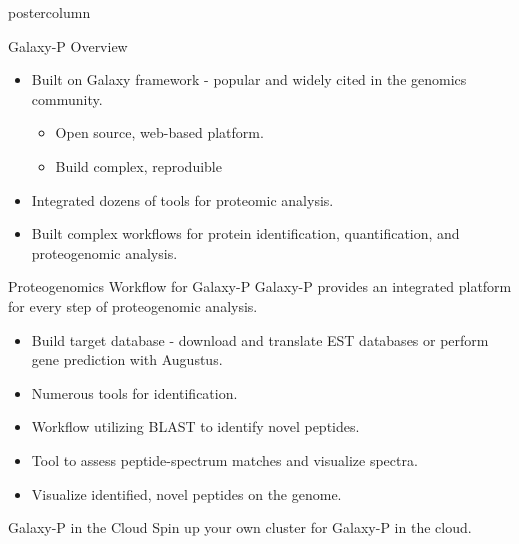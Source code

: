 \documentclass[final]{beamer}
\title[Innovative, Reproducible MS-Based Proteomic Informatics in the Cloud for Emerging Applications with Galaxy-P and CloudBioLinux]{}
\author[John M. Chilton; James E. Johnson; Ebbing P. de Jong; Getiria Onsongo; Benjamin J.
Lynch; Pratik D. Jagtap; Timothy J Griffin]{}
\institute[University of Minnesota]{Supcomputing Institute}
\date{June 10th, 2013}
\newlength{\columnheight}
\begin{document}
\begin{frame}
  \begin{columns}

    \begin{column}{.49\textwidth}
      \begin{beamercolorbox}[center,wd=\textwidth]{postercolumn}
        \begin{minipage}[T]{.95\textwidth}  %
          \parbox[t][\columnheight]{\textwidth}{
            \begin{block}{Galaxy-P Overview}
              \begin{itemize}
              \item Built on Galaxy framework - popular and widely cited in the genomics community.
                \begin{itemize}
                  \item Open source, web-based platform.
                  \item Build complex, reproduible 
                \end{itemize}
              \item Integrated dozens of tools for proteomic analysis.
              \item Built complex workflows for protein identification, quantification, and proteogenomic analysis.
              \end{itemize}
            \end{block}
            \vfill
            \begin{block}{Proteogenomics Workflow for Galaxy-P}
              Galaxy-P provides an integrated platform for every step of proteogenomic analysis.
              \begin{itemize}
                \item Build target database - download and translate EST databases or perform gene prediction with Augustus.
                \item Numerous tools for identification. 
                \item Workflow utilizing BLAST to identify novel peptides.
                \item Tool to assess peptide-spectrum matches and visualize spectra.
                \item Visualize identified, novel peptides on the genome.
              \end{itemize}
            \end{block}
            \vfill
            \begin{block}{Galaxy-P in the Cloud}
              Spin up your own cluster for Galaxy-P in the cloud.
            \end{block}
            \vfill
          }
        \end{minipage}
      \end{beamercolorbox}
    \end{column}


\end{columns}
\end{frame}
\end{document}
